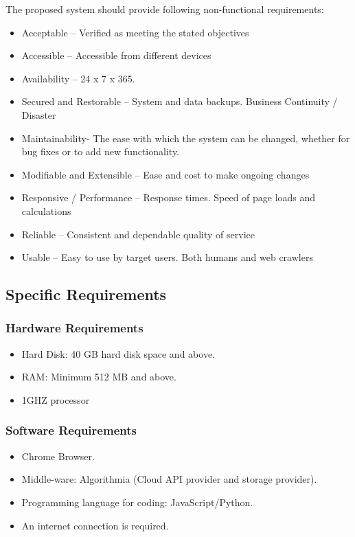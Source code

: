 \documentclass[12pt]{article}
\begin{document}

\pagestyle{fancy}
\fancyhf{}
\renewcommand{\headrulewidth}{0pt}
\cfoot{\thepage}

The proposed system should provide following non-functional requirements:\newline
\begin{itemize}
    \item Acceptable – Verified as meeting the stated objectives
    \item Accessible – Accessible from different devices
    \item Availability – 24 x 7 x 365. 
    \item Secured and Restorable – System and data backups. Business Continuity / Disaster
    \item Maintainability- The ease with which the system can be changed, whether for bug fixes or to add new functionality.
    \item Modifiable and Extensible – Ease and cost to make ongoing changes
    \item Responsive / Performance – Response times. Speed of page loads and calculations
    \item Reliable – Consistent and dependable quality of service
    \item Usable – Easy to use by target users. Both humans and web crawlers
\end{itemize}

\subsection{Specific Requirements}
\subsubsection*{Hardware Requirements}
\begin{itemize}
    \item Hard Disk: 40 GB hard disk space and above.
    \item RAM: Minimum 512 MB and above.
    \item 1GHZ processor
\end{itemize}
\subsubsection*{Software Requirements}
\begin{itemize}
    \item Chrome Browser.
    \item Middle-ware: Algorithmia (Cloud API provider and storage provider).
    \item Programming language for coding: JavaScript/Python. 
    \item An internet connection is required.
\end{itemize}
\end{document}
